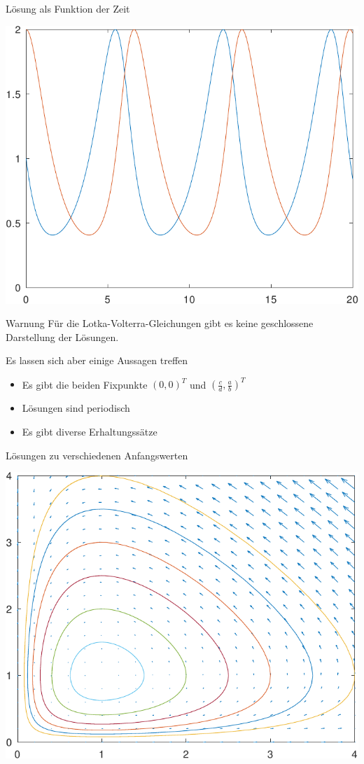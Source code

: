 \begin{frame}{Lösung als Funktion der Zeit}
  \begin{center}
    \includegraphics[width=.7\textwidth]{octave/volterra-timeseries-crop.pdf}
  \end{center}  
\end{frame}

\begin{frame}
  \begin{block}{Warnung}
    Für die Lotka-Volterra-Gleichungen gibt es keine geschlossene
    Darstellung der Lösungen.
  \end{block}

  Es lassen sich aber einige Aussagen treffen
  \begin{itemize}
  \item Es gibt die beiden Fixpunkte $(0,0)^T$ und
    $\left(\tfrac cd,\tfrac ab\right)^T$
  \item Lösungen sind periodisch
  \item Es gibt diverse Erhaltungssätze
  \end{itemize}
\end{frame}

\begin{frame}{Lösungen zu verschiedenen Anfangswerten}
  \begin{center}
    \includegraphics[width=.7\textwidth]{octave/volterra-multi-crop.pdf}
  \end{center}    
\end{frame}

